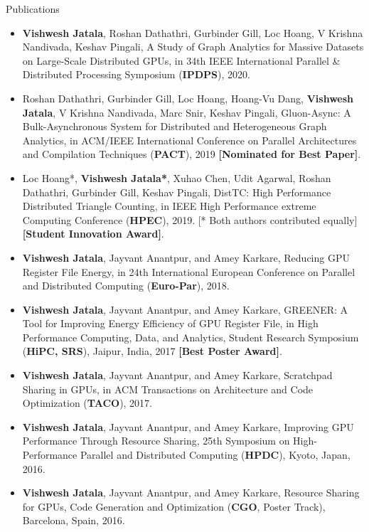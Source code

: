 \documentclass{resume} %
\begin{document}
\begin{rSection}{Publications}
\begin{itemize}
\item \textbf{Vishwesh Jatala}, Roshan Dathathri, Gurbinder Gill, Loc Hoang, V Krishna Nandivada, Keshav Pingali, A Study of Graph Analytics for Massive Datasets on Large-Scale Distributed GPUs, in 34th IEEE International Parallel \& Distributed Processing Symposium (\textbf{IPDPS}), 2020. %
\item Roshan Dathathri, Gurbinder Gill, Loc Hoang, Hoang-Vu Dang, \textbf{Vishwesh Jatala}, V Krishna Nandivada, Marc Snir, Keshav Pingali, Gluon-Async: A Bulk-Asynchronous System for Distributed and Heterogeneous Graph Analytics, in ACM/IEEE International Conference on Parallel Architectures and Compilation Techniques (\textbf{PACT}), 2019 \textbf{[Nominated for Best Paper]}.
\item Loc Hoang*, \textbf{Vishwesh Jatala*}, Xuhao Chen, Udit Agarwal, Roshan Dathathri, Gurbinder Gill, Keshav Pingali, DistTC: High Performance Distributed Triangle Counting, in IEEE High Performance extreme Computing Conference (\textbf{HPEC}), 2019.  [* Both authors contributed equally] \textbf{[Student Innovation Award]}.
\item \textbf{Vishwesh Jatala}, Jayvant Anantpur, and Amey Karkare, Reducing GPU Register File Energy, in 24th International European Conference on Parallel and Distributed Computing (\textbf{Euro-Par}), 2018. 
\item \textbf{Vishwesh Jatala}, Jayvant Anantpur, and Amey Karkare, GREENER: A Tool for Improving Energy Efficiency of GPU Register File, in High Performance Computing, Data, and Analytics, Student Research Symposium (\textbf{HiPC, SRS}), Jaipur, India, 2017 \textbf{[Best Poster Award]}. 
\item \textbf{Vishwesh Jatala}, Jayvant Anantpur, and Amey Karkare, Scratchpad Sharing in GPUs, in ACM Transactions on Architecture and Code Optimization (\textbf{TACO}), 2017. 
\item \textbf{Vishwesh Jatala}, Jayvant Anantpur, and Amey Karkare, Improving GPU Performance Through Resource Sharing, 25th Symposium on High-Performance Parallel and Distributed Computing (\textbf{HPDC}), Kyoto, Japan, 2016.
\item \textbf{Vishwesh Jatala}, Jayvant Anantpur, and Amey Karkare, Resource Sharing for GPUs, Code Generation and Optimization (\textbf{CGO}, Poster Track), Barcelona, Spain, 2016.




\end{itemize}
\end{rSection}
\end{document}
